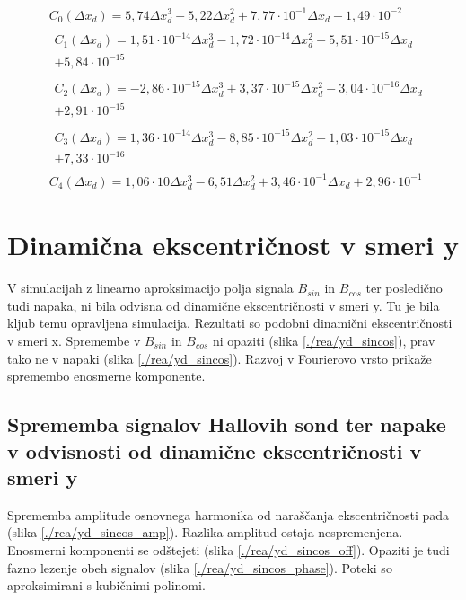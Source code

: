 \begin{eqnarray}
&C_0(\Delta x_d) =5,74\Delta x_d^{3}-5,22\Delta x_d^{2}+7,77\cdot 10^{-1}\Delta x_d-1,49\cdot 10^{-2} \\                               
&\begin{split}C_1(\Delta x_d) =1,51\cdot 10^{-14}\Delta x_d^{3}-1,72\cdot 10^{-14}\Delta x_d^{2}+5,51\cdot 10^{-15}\Delta x_d\\+5,84\cdot 10^{-15}\end{split} \\ 
&\begin{split}C_2(\Delta x_d) =-2,86\cdot 10^{-15}\Delta x_d^{3}+3,37\cdot 10^{-15}\Delta x_d^{2}-3,04\cdot 10^{-16}\Delta x_d\\+2,91\cdot 10^{-15}\end{split} \\
&\begin{split}C_3(\Delta x_d) =1,36\cdot 10^{-14}\Delta x_d^{3}-8,85\cdot 10^{-15}\Delta x_d^{2}+1,03\cdot 10^{-15}\Delta x_d\\+7,33\cdot 10^{-16}\end{split} \\ 
&C_4(\Delta x_d) =1,06\cdot 10\Delta x_d^{3}-6,51\Delta x_d^{2}+3,46\cdot 10^{-1}\Delta x_d+2,96\cdot 10^{-1}
\end{eqnarray}
\section{Dinamična ekscentričnost v smeri y}
V simulacijah z linearno aproksimacijo polja signala $B_{sin}$ in $B_{cos}$ ter posledično tudi napaka, ni bila odvisna od dinamične ekscentričnosti v smeri y. Tu je bila kljub temu opravljena simulacija. Rezultati so podobni dinamični ekscentričnosti v smeri x. Spremembe v $B_{sin}$ in $B_{cos}$ ni opaziti (slika \ref{./rea/yd_sincos}), prav tako ne v napaki (slika \ref{./rea/yd_sincos}). Razvoj v Fourierovo vrsto prikaže spremembo enosmerne komponente.
\newpage
\subsection{Sprememba signalov Hallovih sond ter napake v odvisnosti od dinamične ekscentričnosti v smeri y}
Sprememba amplitude osnovnega harmonika od naraščanja ekscentričnosti pada (slika \ref{./rea/yd_sincos_amp}). Razlika amplitud ostaja nespremenjena. Enosmerni komponenti se odštejeti (slika \ref{./rea/yd_sincos_off}). Opaziti je tudi fazno lezenje obeh signalov (slika \ref{./rea/yd_sincos_phase}).  Poteki so aproksimirani s kubičnimi polinomi.

